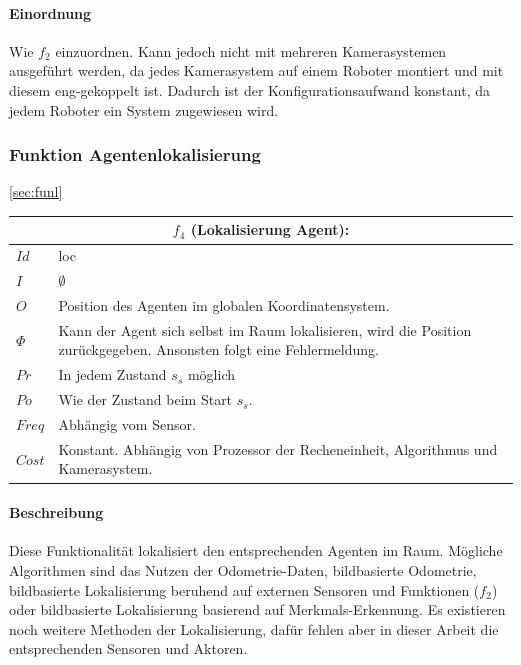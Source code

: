 \paragraph{Einordnung}
Wie $f_2$ einzuordnen. Kann jedoch nicht mit mehreren Kamerasystemen ausgeführt werden, da jedes Kamerasystem auf einem Roboter montiert und mit diesem eng-gekoppelt ist. Dadurch ist der Konfigurationsaufwand konstant, da jedem Roboter ein System zugewiesen wird. 

\subsubsection{Funktion Agentenlokalisierung}
\ref{sec:funl}
\begin{tabular}{|p{3cm}|p{10cm}|}
	\multicolumn{2}{c}{$f_4$ (Lokalisierung Agent):}\\
	\hline  $Id$ & loc\\ 
	\hline  $I$ & $\emptyset$ \\ 
	\hline  $O$ & Position des Agenten im globalen Koordinatensystem. \\ 
	\hline  $\Phi$ & Kann der Agent sich selbst im Raum lokalisieren, wird die Position zurückgegeben. Ansonsten folgt eine Fehlermeldung.\\ 
	\hline $Pr$ & In jedem Zustand $s_s$ möglich \\ 
	\hline $Po$ & Wie der Zustand beim Start $s_s$.\\ 
	\hline $Freq$ & Abhängig vom Sensor.\\ 
	\hline $Cost$ & Konstant. Abhängig von Prozessor der Recheneinheit, Algorithmus und Kamerasystem. \\
	\hline
\end{tabular} 

\paragraph{Beschreibung}
Diese Funktionalität lokalisiert den entsprechenden Agenten im Raum. Mögliche Algorithmen sind das Nutzen der Odometrie-Daten, bildbasierte Odometrie, bildbasierte Lokalisierung beruhend auf externen Sensoren und Funktionen ($f_2$) oder bildbasierte Lokalisierung basierend auf Merkmals-Erkennung. Es existieren noch weitere Methoden der Lokalisierung, dafür fehlen aber in dieser Arbeit die entsprechenden Sensoren und Aktoren.

